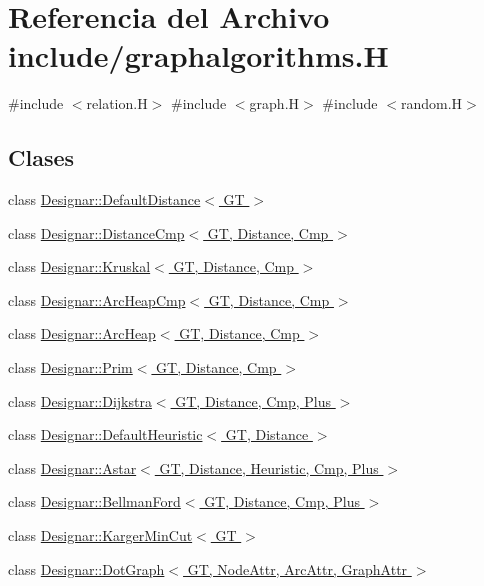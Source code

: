 \hypertarget{graphalgorithms_8_h}{}\section{Referencia del Archivo include/graphalgorithms.H}
\label{graphalgorithms_8_h}
{\ttfamily \#include $<$relation.\+H$>$}\newline
{\ttfamily \#include $<$graph.\+H$>$}\newline
{\ttfamily \#include $<$random.\+H$>$}\newline
\subsection*{Clases}
\begin{DoxyCompactItemize}
\item 
class \hyperlink{class_designar_1_1_default_distance}{Designar\+::\+Default\+Distance$<$ G\+T $>$}
\item 
class \hyperlink{class_designar_1_1_distance_cmp}{Designar\+::\+Distance\+Cmp$<$ G\+T, Distance, Cmp $>$}
\item 
class \hyperlink{class_designar_1_1_kruskal}{Designar\+::\+Kruskal$<$ G\+T, Distance, Cmp $>$}
\item 
class \hyperlink{class_designar_1_1_arc_heap_cmp}{Designar\+::\+Arc\+Heap\+Cmp$<$ G\+T, Distance, Cmp $>$}
\item 
class \hyperlink{class_designar_1_1_arc_heap}{Designar\+::\+Arc\+Heap$<$ G\+T, Distance, Cmp $>$}
\item 
class \hyperlink{class_designar_1_1_prim}{Designar\+::\+Prim$<$ G\+T, Distance, Cmp $>$}
\item 
class \hyperlink{class_designar_1_1_dijkstra}{Designar\+::\+Dijkstra$<$ G\+T, Distance, Cmp, Plus $>$}
\item 
class \hyperlink{class_designar_1_1_default_heuristic}{Designar\+::\+Default\+Heuristic$<$ G\+T, Distance $>$}
\item 
class \hyperlink{class_designar_1_1_astar}{Designar\+::\+Astar$<$ G\+T, Distance, Heuristic, Cmp, Plus $>$}
\item 
class \hyperlink{class_designar_1_1_bellman_ford}{Designar\+::\+Bellman\+Ford$<$ G\+T, Distance, Cmp, Plus $>$}
\item 
class \hyperlink{class_designar_1_1_karger_min_cut}{Designar\+::\+Karger\+Min\+Cut$<$ G\+T $>$}
\item 
class \hyperlink{class_designar_1_1_dot_graph}{Designar\+::\+Dot\+Graph$<$ G\+T, Node\+Attr, Arc\+Attr, Graph\+Attr $>$}
\end{DoxyCompactItemize}
